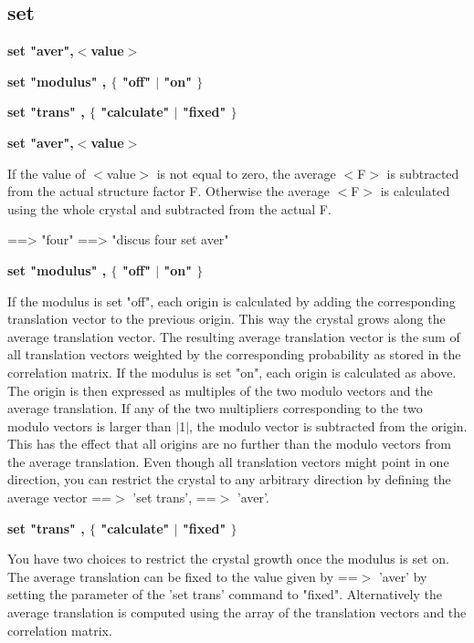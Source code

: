 \subsection*{set}
{\bf set "aver",$ <$value$> $ \par }
{\bf set "modulus" , $ \{$ "off" $| $ "on" $\} $ \par }
{\bf set "trans" , $ \{$ "calculate" $| $ "fixed" $\} $ \par }
\par
{\bf set "aver",$ <$value$> $ \par }
\vspace{3pt}
If the value of $ <$value$> $ is not equal to zero, the average $ <$F$> $ is 
subtracted from the actual structure factor F. 
Otherwise the average $ <$F$> $ is calculated using the whole crystal 
and subtracted from the actual F. 
\par
\begin{MacVerbatim}
==> "four"
==> "discus four set aver"
\end{MacVerbatim}
{\bf set "modulus" , $ \{$ "off" $| $ "on" $\} $ \par }
\vspace{3pt}
If the modulus is set "off", each origin is calculated by adding 
the corresponding translation vector to the previous origin. This 
way the crystal grows along the average translation vector. The 
resulting average translation vector is the sum of all translation 
vectors weighted by the corresponding probability as stored in 
the correlation matrix. 
If the modulus is set "on", each origin is calculated as above. The 
origin is then expressed as multiples of the two modulo vectors and 
the average translation. If any of the two multipliers corresponding 
to the two modulo vectors is larger than $| $1$| $, the modulo vector is 
subtracted from the origin. This has the effect that all origins are 
no further than the modulo vectors from the average translation. 
Even though all translation vectors might point in one direction, 
you can restrict the crystal to any arbitrary direction by defining 
the average vector ==$> $ 'set trans', ==$> $ 'aver'. 
\par
{\bf set "trans" , $ \{$ "calculate" $| $ "fixed" $\} $ \par }
\vspace{3pt}
You have two choices to restrict the crystal growth once the 
modulus is set on. 
The average translation can be fixed to the value given by 
==$> $ 'aver' by setting the parameter of the 'set trans' command to 
"fixed". Alternatively the average translation is computed using 
the array of the translation vectors and the correlation matrix. 
